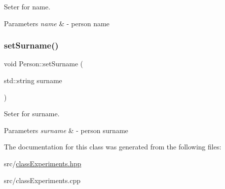 Seter for name. 


\begin{DoxyParams}{Parameters}
{\em name} & -\/ person name \\
\hline
\end{DoxyParams}
\mbox{\label{classPerson_af6a9ce78af39382fbab39f64319c7cde}} 
\subsubsection{\texorpdfstring{set\+Surname()}{setSurname()}}
{\footnotesize\ttfamily void Person\+::set\+Surname (\begin{DoxyParamCaption}\item[{std\+::string}]{surname }\end{DoxyParamCaption})}



Seter for surname. 


\begin{DoxyParams}{Parameters}
{\em surname} & -\/ person surname \\
\hline
\end{DoxyParams}


The documentation for this class was generated from the following files\+:\begin{DoxyCompactItemize}
\item 
src/\hyperlink{classExperiments_8hpp}{class\+Experiments.\+hpp}\item 
src/class\+Experiments.\+cpp\end{DoxyCompactItemize}
